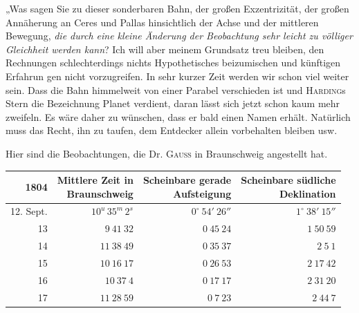 „Was sagen Sie zu dieser sonderbaren Bahn, der großen Exzentrizität, der großen Annäherung an Ceres und Pallas hinsichtlich der Achse und der mittleren Bewegung, \textit{die durch eine kleine Änderung der Beobachtung sehr leicht zu völliger Gleichheit werden kann}? Ich will aber meinem Grundsatz treu bleiben, den Rechnungen schlechterdings nichts Hypothetisches beizumischen und künftigen Erfahrun%
%
gen nicht vorzugreifen. In sehr kurzer Zeit werden wir schon viel weiter sein. Dass die Bahn himmelweit von einer Parabel verschieden ist und \textsc{Harding}s Stern die Bezeichnung Planet verdient, daran lässt sich jetzt schon kaum mehr zweifeln. Es wäre daher zu wünschen, dass er bald einen Namen erhält. Natürlich muss das Recht, ihn zu taufen, dem Entdecker allein vorbehalten bleiben usw.

Hier sind die Beobachtungen, die Dr. \textsc{Gauss} in Braunschweig angestellt hat.

\begin{center}
\begingroup\fontsize{9}{11}\selectfont\setlength{\tabcolsep}{3pt}\renewcommand{\arraystretch}{1.12}
\begin{tabular}{r|r|r|r}
1804 & \shortstack{Mittlere Zeit in\\Braunschweig} & \shortstack{Scheinbare gerade\\Aufsteigung} & \shortstack{Scheinbare südliche\\Deklination} \\ \hline
12. Sept. & $10^{u}\,35^{m}\,2^{s}$ & $0^\circ\ 54'\ 26''$ & $1^\circ\ 38'\ 15''$ \\
13 & $9\ 41\ 32$ & $0\ 45\ 24$ & $1\ 50\ 59$ \\
14 & $11\ 38\ 49$ & $0\ 35\ 37$ & $2\ 5\ 1$ \\
15 & $10\ 16\ 17$ & $0\ 26\ 53$ & $2\ 17\ 42$ \\
16 & $10\ 37\ 4$ & $0\ 17\ 17$ & $2\ 31\ 20$ \\
17 & $11\ 28\ 59$ & $0\ 7\ 23$ & $2\ 44\ 7$ \\
\end{tabular}\endgroup
\end{center}

